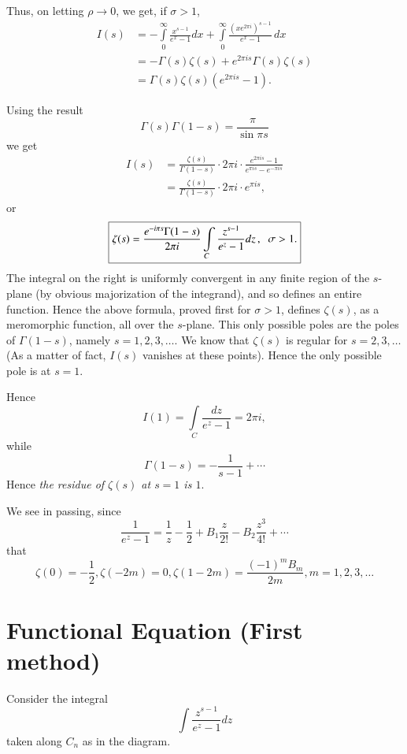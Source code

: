 Thus, on letting $\rho \to 0$, we get, if $\sigma >1$,
\begin{align*}
I(s) & = -\int\limits^\infty_0 \frac{x^{s-1}}{e^x-1} dx +
\int\limits^\infty_0 \frac{(xe^{2\pi i})^{s-1}}{e^x-1} \, dx\\
& = - \Gamma (s)  \zeta (s) + e^{2\pi is} \Gamma (s) \zeta (s)\\
& = \Gamma (s) \zeta(s) (e^{2\pi is} -1).
\end{align*}

Using the result
$$
\Gamma(s) \Gamma(1-s) = \frac{\pi}{ \sin \pi s}
$$
we get\pageoriginale
\begin{align*}
I(s) & = \frac{\zeta(s)}{\Gamma(1-s)} \cdot 2 \pi i \cdot \frac{e^{2\pi i
    s}-1}{e^{\pi i s} - e^{-\pi i s}}\\
& = \frac{\zeta(s)}{\Gamma(1-s)} \cdot 2 \pi i \cdot e^{\pi i s},
\end{align*}
or 
$$
\text{\fbox{$\zeta (s) = \dfrac{e^{-i\pi s} \Gamma (1-s)}{2\pi i}
    \int\limits_C \dfrac{z^{s-1}}{e^z-1}dz\,, \; \; \sigma >1.$}} 
$$
The integral on the right is uniformly convergent in any finite region
of the $s$-plane (by obvious majorization of the integrand), and so
defines an entire function. Hence the above formula, proved first for
$\sigma >1$, defines $\zeta(s)$, as a meromorphic function, all over
the $s$-plane. This only possible poles are the poles of
$\Gamma(1-s)$, namely $s = 1, 2, 3, \ldots$. We know that $\zeta(s)$
is regular for $s = 2,3, \ldots$ (As a matter of fact, $I(s)$ vanishes
at these points). Hence the only possible pole is at $s =1$.

Hence
$$
I(1) = \int\limits_{C} \frac{dz}{e^z-1} = 2 \pi i,
$$
while
$$
\Gamma (1-s) = - \frac{1}{s-1} +\cdots
$$
Hence \textit{the residue of $\zeta(s)$ at $s=1$ is $1$}.

We see in passing, since 
$$
\frac{1}{e^z-1} = \frac{1}{z} - \frac{1}{2} + B_1 \frac{z}{2!} - B_2
\frac{z^3}{4!} + \cdots 
$$\pageoriginale
that
$$
\zeta(0) = - \frac{1}{2}, \zeta(-2m) =0, \zeta(1-2m) = \frac{(-1)^m
  B_m}{2m} , m = 1,2,3,\ldots 
$$

\section[Functional Equation (First method)]{Functional Equation (First method) \cite[p.18]{key16}}\label{chap11:sec4}

Consider the integral
$$
\int \frac{z^{s-1}}{e^z -1}dz
$$
taken along $C_n$ as in the diagram. 

